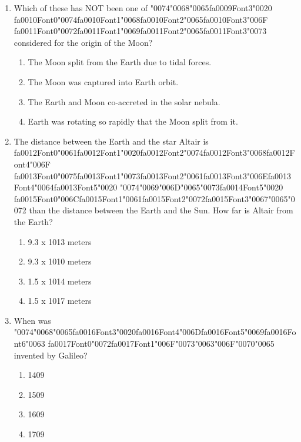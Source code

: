 \documentclass[12pt]{article}
\begin{document}
\begin{enumerate}[label=\arabic*.]
\begin{enumerate}[label=(\alph*)]
\end{enumerate}
\item Which of these has NOT been one of {\char"0074}{\char"0068}{\char"0065}{\csname fa0009Font3\endcsname\char"0020} {\csname fa0010Font0\endcsname\char"0074}{\csname fa0010Font1\endcsname\char"0068}{\csname fa0010Font2\endcsname\char"0065}{\csname fa0010Font3\endcsname\char"006F} {\csname fa0011Font0\endcsname\char"0072}{\csname fa0011Font1\endcsname\char"0069}{\csname fa0011Font2\endcsname\char"0065}{\csname fa0011Font3\endcsname\char"0073} considered for the origin of the
Moon?
\begin{enumerate}[label=(\alph*)]
    \item The Moon split from the Earth due to tidal forces.
    \item The Moon was captured into Earth orbit.
    \item The Earth and Moon co-accreted in the solar nebula.
    \item Earth was rotating so rapidly that the Moon split from it.
\end{enumerate}
\item The distance between the Earth and the star Altair is {\csname fa0012Font0\endcsname\char"0061}{\csname fa0012Font1\endcsname\char"0020}{\csname fa0012Font2\endcsname\char"0074}{\csname fa0012Font3\endcsname\char"0068}{\csname fa0012Font4\endcsname\char"006F} {\csname fa0013Font0\endcsname\char"0075}{\csname fa0013Font1\endcsname\char"0073}{\csname fa0013Font2\endcsname\char"0061}{\csname fa0013Font3\endcsname\char"006E}{\csname fa0013Font4\endcsname\char"0064}{\csname fa0013Font5\endcsname\char"0020} {\char"0074}{\char"0069}{\char"006D}{\char"0065}{\char"0073}{\csname fa0014Font5\endcsname\char"0020} {\csname fa0015Font0\endcsname\char"006C}{\csname fa0015Font1\endcsname\char"0061}{\csname fa0015Font2\endcsname\char"0072}{\csname fa0015Font3\endcsname\char"0067}{\char"0065}{\char"0072} than the
distance between the Earth and the Sun. How far is Altair from the Earth?
\begin{enumerate}[label=(\alph*)]
    \item 9.3 x 1013 meters
    \item 9.3 x 1010 meters
    \item 1.5 x 1014 meters
    \item 1.5 x 1017 meters
\end{enumerate}
\item When was {\char"0074}{\char"0068}{\char"0065}{\csname fa0016Font3\endcsname\char"0020}{\csname fa0016Font4\endcsname\char"006D}{\csname fa0016Font5\endcsname\char"0069}{\csname fa0016Font6\endcsname\char"0063} {\csname fa0017Font0\endcsname\char"0072}{\csname fa0017Font1\endcsname\char"006F}{\char"0073}{\char"0063}{\char"006F}{\char"0070}{\char"0065} invented by Galileo?
\begin{enumerate}[label=(\alph*)]
    \item 1409
    \item 1509
    \item 1609
    \item 1709
\end{enumerate}
\end{enumerate}
\end{document}
